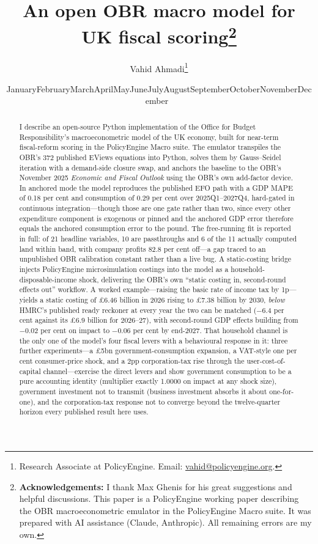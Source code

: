 \documentclass[11pt]{article}
\title{\bfseries An open OBR macro model for UK fiscal scoring\thanks{\textbf{Acknowledgements:} I thank Max Ghenis for his great suggestions and helpful discussions. This paper is a PolicyEngine working paper describing the OBR macroeconometric emulator in the PolicyEngine Macro suite. It was prepared with AI assistance (Claude, Anthropic). All remaining errors are my own.}\\[0.7cm]}
\author{Vahid Ahmadi\thanks{Research Associate at PolicyEngine. Email: \href{mailto:vahid@policyengine.org}{vahid@policyengine.org}.}}
\date{\small \ifcase\month\or January\or February\or March\or April\or May\or June\or July\or August\or September\or October\or November\or December\fi\ \the\year}
\begin{document}
\maketitle

\begin{abstract}
\noindent I describe an open-source Python implementation of the Office for Budget Responsibility's macroeconometric model of the UK economy, built for near-term fiscal-reform scoring in the PolicyEngine Macro suite. The emulator transpiles the OBR's 372 published EViews equations into Python, solves them by Gauss--Seidel iteration with a demand-side closure swap, and anchors the baseline to the OBR's November 2025 \emph{Economic and Fiscal Outlook} using the OBR's own add-factor device. In anchored mode the model reproduces the published EFO path with a GDP MAPE of 0.18 per cent and consumption of 0.29 per cent over 2025Q1--2027Q4, hard-gated in continuous integration---though those are one gate rather than two, since every other expenditure component is exogenous or pinned and the anchored GDP error therefore equals the anchored consumption error to the pound. The free-running fit is reported in full: of 21 headline variables, 10 are passthroughs and 6 of the 11 actually computed land within band, with company profits 82.8 per cent off---a gap traced to an unpublished OBR calibration constant rather than a live bug. A static-costing bridge injects PolicyEngine microsimulation costings into the model as a household-disposable-income shock, delivering the OBR's own ``static costing in, second-round effects out'' workflow. A worked example---raising the basic rate of income tax by 1p---yields a static costing of \pounds 6.46 billion in 2026 rising to \pounds 7.38 billion by 2030, \emph{below} HMRC's published ready reckoner at every year the two can be matched ($-$6.4 per cent against its \pounds 6.9 billion for 2026--27), with second-round GDP effects building from $-$0.02 per cent on impact to $-$0.06 per cent by end-2027. That household channel is the only one of the model's four fiscal levers with a behavioural response in it: three further experiments---a \pounds 5bn government-consumption expansion, a VAT-style one per cent consumer-price shock, and a 2pp corporation-tax rise through the user-cost-of-capital channel---exercise the direct levers and show government consumption to be a pure accounting identity (multiplier exactly 1.0000 on impact at any shock size), government investment not to transmit (business investment absorbs it about one-for-one), and the corporation-tax response not to converge beyond the twelve-quarter horizon every published result here uses.


\end{abstract}
\end{document}
